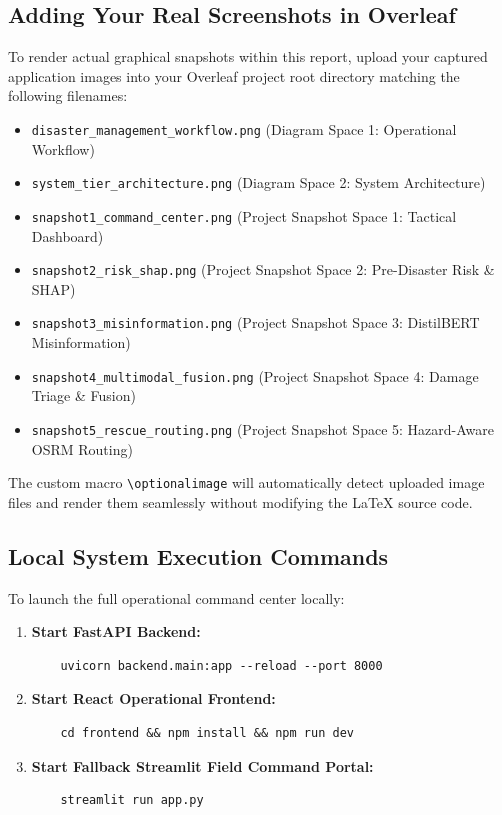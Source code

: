 \documentclass{article}
\begin{document}
\subsection{Adding Your Real Screenshots in Overleaf}
To render actual graphical snapshots within this report, upload your captured application images into your Overleaf project root directory matching the following filenames:
\begin{itemize}
    \item \texttt{disaster\_management\_workflow.png} (Diagram Space 1: Operational Workflow)
    \item \texttt{system\_tier\_architecture.png} (Diagram Space 2: System Architecture)
    \item \texttt{snapshot1\_command\_center.png} (Project Snapshot Space 1: Tactical Dashboard)
    \item \texttt{snapshot2\_risk\_shap.png} (Project Snapshot Space 2: Pre-Disaster Risk \& SHAP)
    \item \texttt{snapshot3\_misinformation.png} (Project Snapshot Space 3: DistilBERT Misinformation)
    \item \texttt{snapshot4\_multimodal\_fusion.png} (Project Snapshot Space 4: Damage Triage \& Fusion)
    \item \texttt{snapshot5\_rescue\_routing.png} (Project Snapshot Space 5: Hazard-Aware OSRM Routing)
\end{itemize}
The custom macro \texttt{\textbackslash optionalimage} will automatically detect uploaded image files and render them seamlessly without modifying the \LaTeX{} source code.

\subsection{Local System Execution Commands}
To launch the full operational command center locally:
\begin{enumerate}
    \item \textbf{Start FastAPI Backend:}
    \begin{verbatim}
    uvicorn backend.main:app --reload --port 8000
    \end{verbatim}
    \item \textbf{Start React Operational Frontend:}
    \begin{verbatim}
    cd frontend && npm install && npm run dev
    \end{verbatim}
    \item \textbf{Start Fallback Streamlit Field Command Portal:}
    \begin{verbatim}
    streamlit run app.py
    \end{verbatim}
\end{enumerate}
\end{document}
